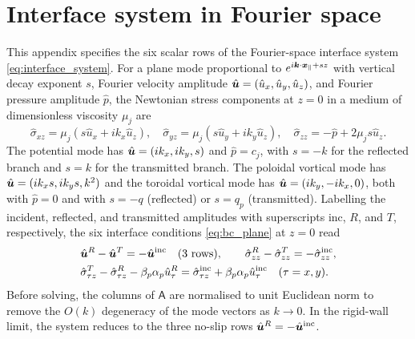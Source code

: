 \section{Interface system in Fourier space}\label{app:interface}
This appendix specifies the six scalar rows of the Fourier-space interface system \cref{eq:interface_system}. For a
plane mode proportional to $e^{i\bm{k}\cdot\bm{x}_\parallel+sz}$ with vertical decay exponent $s$, Fourier velocity amplitude
$\hat{\bm{u}}=(\hat u_x,\hat u_y,\hat u_z)$, and Fourier pressure amplitude $\hat p$, the Newtonian stress components at $z=0$
in a medium of dimensionless viscosity $\mu_j$ are
\begin{equation*}
  \hat\sigma_{xz}=\mu_j\left(s\hat u_x+ik_x\hat u_z\right),\quad
  \hat\sigma_{yz}=\mu_j\left(s\hat u_y+ik_y\hat u_z\right),\quad
  \hat\sigma_{zz}=-\hat p+2\mu_js\hat u_z .
\end{equation*}
The potential mode has $\hat{\bm{u}}=(ik_x,ik_y,s)$ and $\hat p=c_j$, with $s=-k$ for the reflected branch and $s=k$ for the
transmitted branch. The poloidal vortical mode has $\hat{\bm{u}}=(ik_xs,ik_ys,k^2)$ and the toroidal vortical mode has
$\hat{\bm{u}}=(ik_y,-ik_x,0)$, both with $\hat p=0$ and with $s=-q$ (reflected) or $s=q_p$ (transmitted). Labelling the
incident, reflected, and transmitted amplitudes with superscripts inc, $R$, and $T$, respectively, the six interface
conditions \cref{eq:bc_plane} at $z=0$ read
\begin{align*}
  &\hat\bu^{R}-\hat\bu^{T}=-\hat\bu^{\rm inc}\quad(3\ \text{rows}),\qquad
  \hat\sigma^{R}_{zz}-\hat\sigma^{T}_{zz}=-\hat\sigma^{\rm inc}_{zz},\\
  &\hat\sigma^{T}_{\tau z}-\hat\sigma^{R}_{\tau z}-\beta_p\alpha_p\hat u^{R}_\tau
   =\hat\sigma^{\rm inc}_{\tau z}+\beta_p\alpha_p\hat u^{\rm inc}_\tau\quad(\tau=x,y).
\end{align*}
Before solving, the columns of $\mathsf A$ are normalised to unit Euclidean norm to remove the $O(k)$ degeneracy of the
mode vectors as $k\to0$. In the rigid-wall limit, the system reduces to the three no-slip rows $\hat{\bm{u}}^R=-\hat{\bm{u}}^{\rm inc}$.

